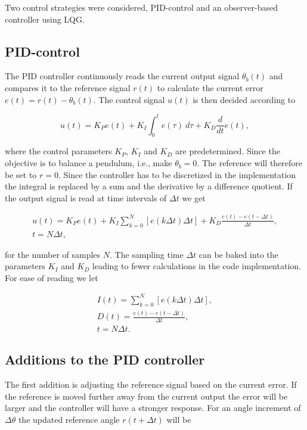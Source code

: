 Two control strategies were considered, PID-control and an observer-based controller using LQG.

\subsection{PID-control}
The PID controller continuously reads the current output signal $\theta_b(t)$ and compares it to the reference signal $r(t)$ to calculate the current error $e(t) = r(t) - \theta_b(t)$. The control signal $u(t)$ is then decided according to

\begin{equation}\label{eq:PIDcont}
    u(t) = K_P e(t) + K_I \int_0^t e(\tau) \ d\tau + K_D \frac{d}{dt}e(t),
\end{equation}

\noindent
where the control parameters $K_P$, $K_I$ and $K_D$ are predetermined. Since the objective is to balance a pendulum, i.e., make $\theta_b=0$. The reference will therefore be set to $r=0$. Since the controller has to be discretized in the implementation the integral is replaced by a sum and the derivative by a difference quotient. If the output signal is read at time intervals of $\Delta t$ we get

\begin{equation}\label{eq:PIDdisc}
    \begin{gathered}
        u(t) = K_Pe(t) + K_I \sum_{k=0}^N [e(k\Delta t)\Delta t] + K_D \frac{e(t) - e(t-\Delta t)}{\Delta t}, \\
        t = N\Delta t,
    \end{gathered}
\end{equation}

\noindent
for the number of samples $N$. The sampling time $\Delta t$ can be baked into the parameters $K_I$ and $K_D$ leading to fewer calculations in the code implementation. For ease of reading we let 

\begin{equation}
    \begin{gathered}
        I(t) = \sum_{k=0}^N [e(k\Delta t)\Delta t], \\
        D(t) = \frac{e(t) - e(t-\Delta t)}{\Delta t}, \\
        t = N\Delta t.
    \end{gathered}
\end{equation}

\subsection{Additions to the PID controller}
The first addition is adjusting the reference signal based on the current error. If the reference is moved further away from the current output the error will be larger and the controller will have a stronger response. For an angle increment of $\Delta\theta$ the updated reference angle $r(t+\Delta t)$ will be


